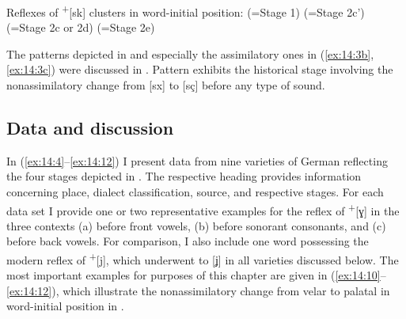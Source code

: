 \ea%
\label{ex:14:3}Reflexes of  \textsuperscript{+}[sk] clusters in word-initial position:
\ea\label{ex:14:3a} \tab (=Stage 1)
\ex\label{ex:14:3b} \tab (=Stage 2c')
\ex\label{ex:14:3c} \tab (=Stage 2c or 2d)
\ex\label{ex:14:3d} \tab (=Stage 2e)
\ex\label{ex:14:3e}\relax [ʃi    ʃr     ʃɑ]
\z
\z

The patterns depicted in  and especially the assimilatory ones in (\ref{ex:14:3b}, \ref{ex:14:3c}) were discussed in . Pattern  exhibits the historical stage involving the nonassimilatory change from [sx] to [sç] before any type of sound.

\subsection{Data and discussion}\label{sec:14.2.2}

In (\ref{ex:14:4}--\ref{ex:14:12}) I present data from nine varieties of German reflecting the four stages depicted in . The respective heading provides information concerning place, dialect classification, source, and respective stages. For each data set I provide one or two representative examples for the reflex of  \textsuperscript{+}[ɣ] in the three contexts (a) before front vowels, (b) before sonorant consonants, and (c) before back vowels. For comparison, I also include one word possessing the modern reflex of  \textsuperscript{+}[j], which underwent  to [ʝ] in all varieties discussed below. The most important examples for purposes of this chapter are given in (\ref{ex:14:10}--\ref{ex:14:12}), which illustrate the nonassimilatory change from velar to palatal in word-initial position in .\largerpage[2]

